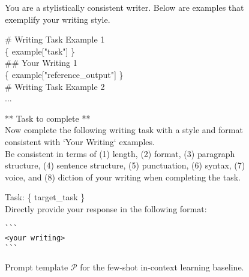 \begin{figure*}
    \centering
\begin{tcolorbox}[width=\textwidth]
\fontsize{8pt}{8pt}\selectfont\ttfamily
You are a stylistically consistent writer. Below are examples that exemplify your writing style.

\vspace{2mm}

\# Writing Task Example 1 \\ 
\{ example["task"] \} \\ 
\#\# Your Writing 1 \\ 
\{ example["reference\_output"] \} \\ 

\# Writing Task Example 2 \\ 
... \\ 
\vspace{2mm}

** Task to complete ** \\ 
Now complete the following writing task with a style and format consistent with `Your Writing` examples.
\\
Be consistent in terms of (1) length, (2) format, (3) paragraph structure, (4) sentence structure, (5) punctuation, (6) syntax, (7) voice, and (8) diction of your writing when completing the task. 
\\
\vspace{2mm}

Task: \{ target\_task \} \\ 

Directly provide your response in the following format:\\ 
\begin{verbatim} 
```
<your writing>
```
\end{verbatim}

    
\end{tcolorbox}
    \caption{Prompt template $\mathcal{P}$ for the few-shot in-context learning baseline.}
    \label{fig:fewshot_prompt}
\end{figure*}

